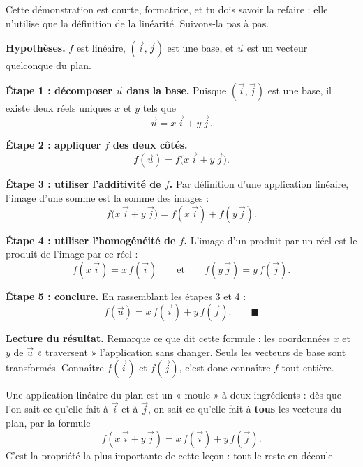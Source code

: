 \documentclass[11pt]{article}
\begin{document}
\begin{experience}
Cette démonstration est courte, formatrice, et tu dois savoir la refaire : elle n'utilise que la définition de la linéarité. Suivons-la pas à pas.

\textbf{Hypothèses.} $f$ est linéaire, $(\vec{i}, \vec{j})$ est une base, et $\vec{u}$ est un vecteur quelconque du plan.

\textbf{Étape 1 : décomposer $\vec{u}$ dans la base.} Puisque $(\vec{i}, \vec{j})$ est une base, il existe deux réels uniques $x$ et $y$ tels que
\[ \vec{u} = x\,\vec{i} + y\,\vec{j}. \]

\textbf{Étape 2 : appliquer $f$ des deux côtés.}
\[ f(\vec{u}) = f\bigl(x\,\vec{i} + y\,\vec{j}\bigr). \]

\textbf{Étape 3 : utiliser l'additivité de $f$.} Par définition d'une application linéaire, l'image d'une somme est la somme des images :
\[ f\bigl(x\,\vec{i} + y\,\vec{j}\bigr) = f(x\,\vec{i}) + f(y\,\vec{j}). \]

\textbf{Étape 4 : utiliser l'homogénéité de $f$.} L'image d'un produit par un réel est le produit de l'image par ce réel :
\[ f(x\,\vec{i}) = x\,f(\vec{i}) \qquad \text{et} \qquad f(y\,\vec{j}) = y\,f(\vec{j}). \]

\textbf{Étape 5 : conclure.} En rassemblant les étapes 3 et 4 :
\[ f(\vec{u}) = x\,f(\vec{i}) + y\,f(\vec{j}). \qquad \blacksquare \]

\textbf{Lecture du résultat.} Remarque ce que dit cette formule : les coordonnées $x$ et $y$ de $\vec{u}$ « traversent » l'application sans changer. Seuls les vecteurs de base sont transformés. Connaître $f(\vec{i})$ et $f(\vec{j})$, c'est donc connaître $f$ tout entière.
\end{experience}

\begin{aretenir}
Une application linéaire du plan est un « moule » à deux ingrédients : dès que l'on sait ce qu'elle fait à $\vec{i}$ et à $\vec{j}$, on sait ce qu'elle fait à \textbf{tous} les vecteurs du plan, par la formule
\[ f(x\,\vec{i} + y\,\vec{j}) = x\,f(\vec{i}) + y\,f(\vec{j}). \]
C'est la propriété la plus importante de cette leçon : tout le reste en découle.
\end{aretenir}
\end{document}
